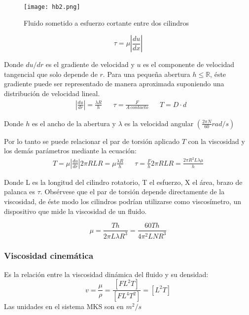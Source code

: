 \begin{figure}[h!]
    \centerline{\texttt{[image: hb2.png]}}
    \caption{Fluido sometido a esfuerzo cortante entre dos cilindros}
    \label{hb2}
\end{figure}

\begin{equation}
    \tau=\mu\left\lvert \frac{du}{dx}\right\rvert 
\end{equation}

Donde $du/dr$ es el gradiente de velocidad y $u$ es el componente de velocidad tangencial que solo depende de $r$. Para una pequeña abertura $h\leq \mathbb{R}$, éste gradiente puede ser representado de manera aproximada suponiendo una distribución de velocidad lineal.
\begin{align}
    &\left\lvert \frac{du}{dr}\right\rvert =\frac{\lambda R}{h}&& \tau=\frac{F}{A\, contacto}&& T=D\cdot d
\end{align}

Donde $h$ es el ancho de la abertura y $\lambda$ es la velocidad angular $\left(\frac{2\pi N}{60}rad/s\right)$

Por lo tanto se puede relacionar el par de torsión aplicado $T$ con la viscosidad y los demás parámetros mediante la ecuación:
\begin{align}
    T=\mu \left\lvert \frac{du}{dr}\right\rvert 2\pi RLR=\mu\frac{\lambda R}{h}&& \tau=\frac{F}{h}2\pi RLR=\frac{2\pi R^2L\lambda \mu}{h}
\end{align}

Donde L es la longitud del cilindro rotatorio, T el esfuerzo, X el área, brazo de palanca es $\tau$. Obsérvese que el par de torsión depende directamente de la viscosidad, de éste modo los cilindros podrían utilizarse como viscosímetro, un dispositivo que mide la viscosidad de un fluido.

\begin{equation}
    \mu=\frac{Th}{2\pi L\lambda R^3}=\frac{60Th}{4\pi^2LNR^3}
\end{equation}

\subsubsection{Viscosidad cinemática}

\begin{definition}
    Es la relación entre la viscosidad dinámica del fluido y su densidad:
    \begin{equation}
        v=\frac{\mu}{\rho}=\frac{\left[FL^2T\right]}{\left[FL^4T^2\right]}=\left[L^2T\right]
    \end{equation}
    Las unidades en el sistema MKS son en $m^2/s$
\end{definition}

